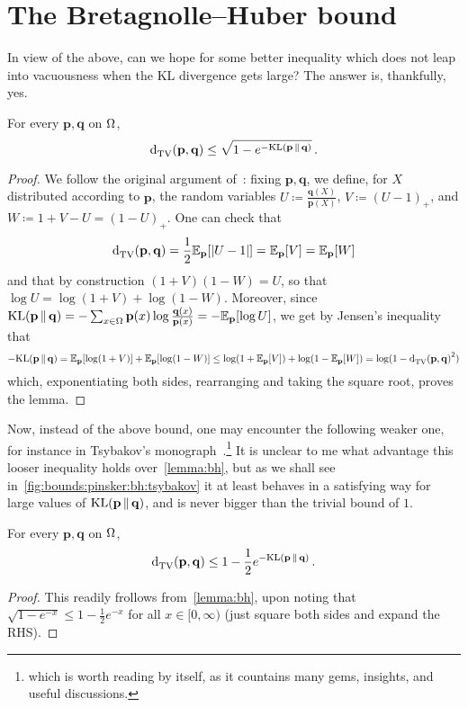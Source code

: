\documentclass[10pt]{article}
\renewcommand{\eqdef}{\coloneqq}
\newcommand{\p}{\mathbf{p}}
\newcommand{\q}{\mathbf{q}}
\begin{document}
\section{The Bretagnolle--Huber bound}
In view of the above, can we hope for some better inequality which does not leap into vacuousness when the KL divergence gets large? The answer is, thankfully, yes.
  \label{sec:bh}
\begin{lemma}
  \label{lemma:bh}
For every $\p,\q$ on $\Omega$, 
\begin{equation}
  \label{eq:bh}
  \totalvardist{\p}{\q} \leq \sqrt{1-e^{-\kldiv{\p}{\q}}}\,.
\end{equation}
\end{lemma}
\begin{proof}
We follow the original argument of~\cite[Lemma~2.1]{BretagnolleH78}: fixing $\p,\q$, we define, for $X$ distributed according to $\p$, the random variables $U\eqdef \frac{\q(X)}{\p(X)}$, $V\eqdef (U-1)_+$, and $W\eqdef 1+V-U=(1-U)_+$. One can check that
\[
    \totalvardist{\p}{\q} = \frac{1}{2}\shortexpect_{\p}[\abs{U-1}] = \shortexpect_{\p}[V] = \shortexpect_{\p}[W]
\]
and that by construction $(1+V)(1-W)=U$, so that $\log U = \log(1+V)+\log(1-W)$. Moreover, since
$
  \kldiv{\p}{\q} = -\sum_{x\in\domain}\p(x)\log\frac{\q(x)}{\p(x)} = -\shortexpect_{\p}[\log U]
$, we get by Jensen's inequality that
\[
  -\kldiv{\p}{\q} = \shortexpect_{\p}[\log(1+V)]+\shortexpect_{\p}[\log(1-W)] \leq \log(1+\shortexpect_{\p}[V])+\log(1-\shortexpect_{\p}[W])
  = \log(1-\totalvardist{\p}{\q}^2)
\]
which, exponentiating both sides, rearranging and taking the square root, proves the lemma.
\end{proof}
Now, instead of the above bound, one may encounter the following weaker one, for instance in Tsybakov's monograph~\cite{Tsybakov09}.\footnote{which is worth reading by itself, as it countains many gems, insights, and useful discussions.} It is unclear to me what advantage this looser inequality holds over~\eqref{lemma:bh}, but as we shall see in~\autoref{fig:bounds:pinsker:bh:tsybakov} it at least behaves in a satisfying way for large values of $\kldiv{\p}{\q}$, and is never bigger than the trivial bound of $1$.
\begin{corollary}
  \label{lemma:bh:tsybakov}
For every $\p,\q$ on $\Omega$, 
\begin{equation}
  \label{eq:bh:tsybakov}
  \totalvardist{\p}{\q} \leq 1-\frac{1}{2}e^{-\kldiv{\p}{\q}}\,.
\end{equation}
\end{corollary}
\begin{proof}
  This readily frollows from~\autoref{lemma:bh}, upon noting that $\sqrt{1-e^{-x}} \leq 1-\frac{1}{2}e^{-x}$ for all $x\in[0,\infty)$ (just square both sides and expand the RHS).
\end{proof}
\end{document}
